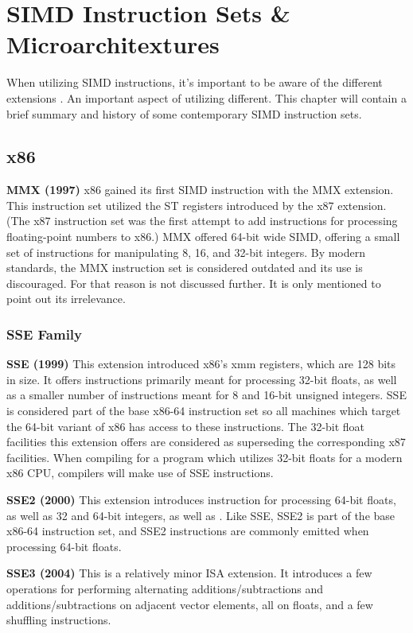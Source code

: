 \chapter{SIMD Instruction Sets \& Microarchitextures}
When utilizing SIMD instructions, it's important to be aware of the different
extensions . An important aspect of utilizing different. This chapter will
contain a brief summary and history of some contemporary SIMD instruction sets. 

\section{x86}

\textbf{MMX (1997)} x86 gained its first SIMD instruction with the MMX
extension. This instruction set utilized the ST registers introduced by the x87
extension. (The x87 instruction set was the first attempt to add instructions
for processing floating-point numbers to x86.) MMX offered 64-bit wide SIMD,
offering a small set of instructions for manipulating 8, 16, and 32-bit
integers. By modern standards, the MMX instruction set is considered outdated
and its use is discouraged. For that reason is not discussed further. It is only
mentioned to point out its irrelevance.

\subsection{SSE Family}
\textbf{SSE (1999)} This extension introduced x86's xmm registers, which are 128
bits in size. It offers instructions primarily meant for processing 32-bit
floats, as well as a smaller number of instructions meant for 8 and 16-bit
unsigned integers. SSE is considered part of the base x86-64 instruction set so
all machines which target the 64-bit variant of x86 has access to these
instructions. The 32-bit float facilities this extension offers are considered
as superseding the corresponding x87 facilities. When compiling for a program
which utilizes 32-bit floats for a modern x86 CPU, compilers will make use of
SSE instructions.

\textbf{SSE2 (2000)} This extension introduces instruction for processing 64-bit
floats, as well as 32 and 64-bit integers, as well as . Like SSE, SSE2 is part
of the base x86-64 instruction set, and SSE2 instructions are commonly emitted
when processing 64-bit floats.

\textbf{SSE3 (2004)} This is a relatively minor ISA extension. It introduces a
few operations for performing alternating additions/subtractions and
additions/subtractions on adjacent vector elements, all on floats, and a few
shuffling instructions.

